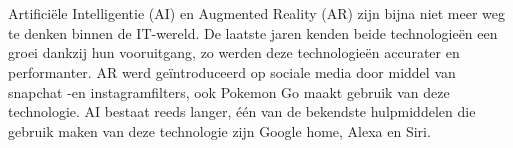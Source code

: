 
%
%

%



\chapter*{}

Artificiële Intelligentie (AI) en Augmented Reality (AR) zijn bijna niet meer weg te denken binnen de IT-wereld. De laatste jaren kenden beide technologieën een groei dankzij hun vooruitgang, zo werden deze technologieën accurater en performanter. AR werd geïntroduceerd op sociale media door middel van snapchat -en instagramfilters, ook Pokemon Go maakt gebruik van deze technologie. AI bestaat reeds langer, één van de bekendste hulpmiddelen die gebruik maken van deze technologie zijn Google home, Alexa en Siri. 

